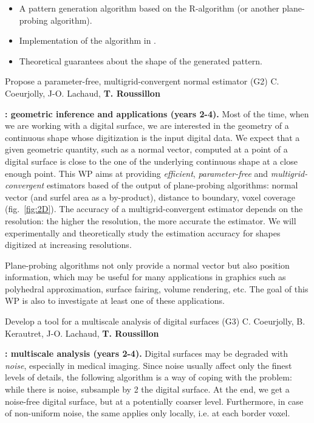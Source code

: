 \Success
\begin{itemize}
  \item A pattern generation algorithm based on the R-algorithm (or another plane-probing algorithm).
  \item Implementation of the algorithm in \DGtal.
  \item Theoretical guarantees about the shape of the generated pattern. 
\end{itemize}


\newpage

   {Propose a parameter-free, multigrid-convergent normal estimator (G2)}
   {C. Coeurjolly, J-O. Lachaud, \textbf{T. Roussillon}}
\medskip

\noindent\textbf{\wpEstim: geometric inference and applications (years 2-4).} Most of the time, when we are working with a digital surface, we are 
interested in the geometry of a continuous shape whose digitization is the input digital data.
We expect that a given geometric quantity, such as a normal vector, computed at a point of a digital surface is close to the one of the underlying continuous shape at a close enough point. 
This WP aims at providing \emph{efficient}, \emph{parameter-free} and \emph{multigrid-convergent} estimators based of the output of plane-probing algorithms: normal vector (and surfel area as a by-product), distance to boundary, voxel coverage (fig.~\ref{fig:2D}). The accuracy of a multigrid-convergent estimator depends on the resolution: the higher the resolution, the more accurate the estimator. We will experimentally and theoretically study the estimation accuracy for shapes digitized at increasing resolutions. 

Plane-probing algorithms not only provide a normal vector but also position information, which may be useful for many applications in graphics such as polyhedral approximation, surface fairing, volume rendering, etc. The goal of this WP is also to investigate at least one of these applications.   

\newpage

   {Develop a tool for a multiscale analysis of digital surfaces (G3)}
   {C. Coeurjolly, B. Kerautret, J-O. Lachaud, \textbf{T. Roussillon}}
\medskip

\noindent\textbf{\wpScale: multiscale analysis (years 2-4).} Digital surfaces may be degraded with \emph{noise}, especially in medical imaging. Since noise usually affect only the finest levels of details, the following algorithm is a way of coping with the problem: while there is noise, subsample by 2 the digital surface. At the end, we get a noise-free digital surface, but at a potentially coarser level. Furthermore, in case of non-uniform noise, the same applies only locally, i.e. at each border voxel.  

